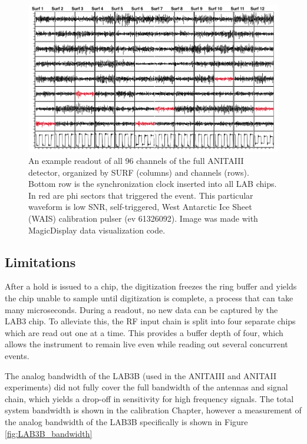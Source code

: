 		
\begin{figure}
\centering
	\includegraphics[width=\textwidth]{figures/waveformSnapshot}
	\caption{An example readout of all 96 channels of the full ANITAIII detector, organized by SURF (columns) and channels (rows).  Bottom row is the synchronization clock inserted into all LAB chips.  In red are phi sectors that triggered the event.  This particular waveform is low SNR, self-triggered, West Antarctic Ice Sheet (WAIS) calibration pulser (ev 61326092).  Image was made with MagicDisplay data visualization code.}
	\label{fig:waveformSnapshot}
\end{figure}
		
	
	
	\subsection{Limitations}
	After a hold is issued to a chip, the digitization freezes the ring buffer and yields the chip unable to sample until digitization is complete, a process that can take  many microseconds.  During a readout, no new data can be captured by the LAB3 chip.  To alleviate this, the RF input chain is split into four separate chips which are read out one at a time.  This provides a buffer depth of four, which allows the instrument to remain live even while reading out several concurrent events.
	
	The analog bandwidth of the LAB3B (used in the ANITAIII and ANITAII experiments) did not fully cover the full bandwidth of the antennas and signal chain, which yields a drop-off in sensitivity for high frequency signals.  The total system bandwidth is shown in the calibration Chapter, however a measurement of the analog bandwidth of the LAB3B specifically is shown in Figure \ref{fig:LAB3B_bandwidth}
	
